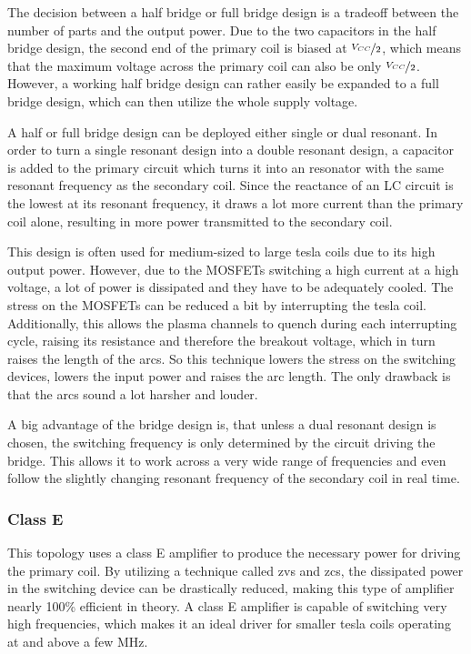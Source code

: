 The decision between a half bridge or full bridge design is a tradeoff between the number of parts and the output power. Due to the two capacitors in the half bridge design, the second end of the primary coil is biased at  \(\nicefrac{V_{CC}}{2}\), which means that the maximum voltage across the primary coil can also be only \(\nicefrac{V_{CC}}{2}\). However, a working half bridge design can rather easily be expanded to a full bridge design, which can then utilize the whole supply voltage.

A half or full bridge design can be deployed either single or dual resonant. In order to turn a single resonant design into a double resonant design, a capacitor is added to the primary circuit which turns it into an resonator with the same resonant frequency as the secondary coil. Since the reactance of an LC circuit is the lowest at its resonant frequency, it draws a lot more current than the primary coil alone, resulting in more power transmitted to the secondary coil.

This design is often used for medium-sized to large tesla coils due to its high output power. However, due to the MOSFETs switching a high current at a high voltage, a lot of power is dissipated and they have to be adequately cooled. The stress on the MOSFETs can be reduced a bit by interrupting the tesla coil. Additionally, this allows the plasma channels to quench during each interrupting cycle, raising its resistance and therefore the breakout voltage, which in turn raises the length of the arcs. So this technique lowers the stress on the switching devices, lowers the input power and raises the arc length. The only drawback is that the arcs sound a lot harsher and louder.

A big advantage of the bridge design is, that unless a dual resonant design is chosen, the switching frequency is only determined by the circuit driving the bridge. This allows it to work across a very wide range of frequencies and even follow the slightly changing resonant frequency of the secondary coil in real time.

\subsubsection{Class E}

This topology uses a class E amplifier to produce the necessary power for driving the primary coil. By utilizing a technique called \gls{zvs} and \gls{zcs}, the dissipated power in the switching device can be drastically reduced, making this type of amplifier nearly 100\% efficient in theory. A class E amplifier is capable of switching very high frequencies, which makes it an ideal driver for smaller tesla coils operating at and above a few MHz.

